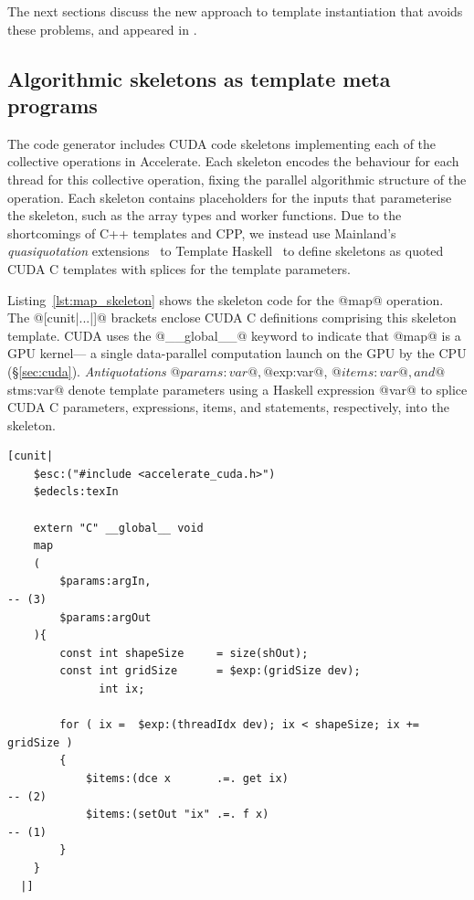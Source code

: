 The next sections discuss the new approach to template instantiation that avoids
these problems, and appeared in \cite{CliftonEverest:2014vi}.


\subsection{Algorithmic skeletons as template meta programs}

The code generator includes CUDA code skeletons implementing each of the
collective operations in Accelerate. Each skeleton encodes the behaviour for
each thread for this collective operation, fixing the parallel algorithmic
structure of the operation. Each skeleton contains placeholders for the inputs
that parameterise the skeleton, such as the array types and worker functions.
Due to the shortcomings of C++ templates and CPP, we instead use Mainland's
\emph{quasiquotation}\qq{} extensions~\cite{Mainland:2007bl} to Template
Haskell~\cite{Sheard:2002wu} to define skeletons as quoted CUDA C templates
with splices for the template parameters.

Listing~\ref{lst:map_skeleton} shows the skeleton code for the @map@
operation. The @[cunit|...|]@ brackets enclose CUDA C definitions
comprising this skeleton\skeleton{} template. CUDA uses the
@__global__@ keyword to indicate that @map@ is a GPU
kernel\cuda[kernel] --- a single data-parallel computation launch on the GPU by
the CPU (\S\ref{sec:cuda}). \emph{Antiquotations}\aq{} @$params:var@,
@$exp:var@, @$items:var@, and @$stms:var@ denote template parameters using a
Haskell expression @var@ to splice CUDA C parameters, expressions, items, and
statements, respectively, into the skeleton.

\begin{lstlisting}[style=haskell_float,
    name=map_skeleton,
    label=lst:map_skeleton,
    caption={Accelerate CUDA skeleton for the \code{map} operation}]
[cunit|
    $esc:("#include <accelerate_cuda.h>")
    $edecls:texIn

    extern "C" __global__ void
    map
    (
        $params:argIn,                                                                 -- (3)
        $params:argOut
    ){
        const int shapeSize     = size(shOut);
        const int gridSize      = $exp:(gridSize dev);
              int ix;

        for ( ix =  $exp:(threadIdx dev); ix < shapeSize; ix += gridSize )
        {
            $items:(dce x       .=. get ix)                                            -- (2)
            $items:(setOut "ix" .=. f x)                                               -- (1)
        }
    }
  |]
\end{lstlisting}

